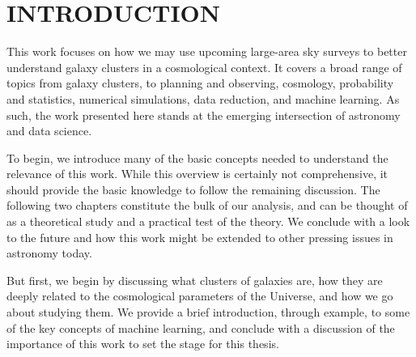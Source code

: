 %
%
%



\pagestyle{plain} %
\setcounter{page}{1}


\chapter[\uppercase{Introduction}]{\uppercase{Introduction}}

This work focuses on how we may use upcoming large-area sky surveys to better understand galaxy clusters in a cosmological context. It covers a broad range of topics from galaxy clusters, to planning and observing, cosmology, probability and statistics, numerical simulations, data reduction, and machine learning. As such, the work presented here stands at the emerging intersection of astronomy and data science.

To begin, we introduce many of the basic concepts needed to understand the relevance of this work. While this overview is certainly not comprehensive, it should provide the basic knowledge to follow the remaining discussion. The following two chapters constitute the bulk of our analysis, and can be thought of as a theoretical study and a practical test of the theory. We conclude with a look to the future and how this work might be extended to other pressing issues in astronomy today.

But first, we begin by discussing what clusters of galaxies are, how they are deeply related to the cosmological parameters of the Universe, and how we go about studying them. We provide a brief introduction, through example, to some of the key concepts of machine learning, and conclude with a discussion of the importance of this work to set the stage for this thesis.

